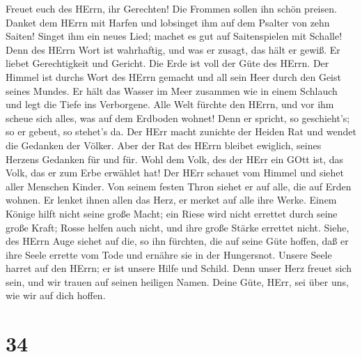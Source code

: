  Freuet euch des HErrn, ihr Gerechten! Die Frommen sollen
ihn schön preisen.  Danket dem HErrn mit Harfen und
lobsinget ihm auf dem Psalter von zehn Saiten!  Singet ihm
ein neues Lied; machet es gut auf Saitenspielen mit Schalle!
 Denn des HErrn Wort ist wahrhaftig, und was er zusagt, das
hält er gewiß.  Er liebet Gerechtigkeit und Gericht. Die
Erde ist voll der Güte des HErrn.  Der Himmel ist durchs
Wort des HErrn gemacht und all sein Heer durch den Geist seines Mundes.
 Er hält das Wasser im Meer zusammen wie in einem Schlauch
und legt die Tiefe ins Verborgene.  Alle Welt fürchte den
HErrn, und vor ihm scheue sich alles, was auf dem Erdboden wohnet!
 Denn er spricht, so geschieht's; so er gebeut, so stehet's
da.  Der HErr macht zunichte der Heiden Rat und wendet die
Gedanken der Völker.  Aber der Rat des HErrn bleibet
ewiglich, seines Herzens Gedanken für und für.  Wohl dem
Volk, des der HErr ein GOtt ist, das Volk, das er zum Erbe erwählet hat!
 Der HErr schauet vom Himmel und siehet aller Menschen
Kinder.  Von seinem festen Thron siehet er auf alle, die
auf Erden wohnen.  Er lenket ihnen allen das Herz, er
merket auf alle ihre Werke.  Einem Könige hilft nicht seine
große Macht; ein Riese wird nicht errettet durch seine große Kraft;
 Rosse helfen auch nicht, und ihre große Stärke errettet
nicht.  Siehe, des HErrn Auge siehet auf die, so ihn
fürchten, die auf seine Güte hoffen,  daß er ihre Seele
errette vom Tode und ernähre sie in der Hungersnot.  Unsere
Seele harret auf den HErrn; er ist unsere Hilfe und Schild.
 Denn unser Herz freuet sich sein, und wir trauen auf
seinen heiligen Namen.  Deine Güte, HErr, sei über uns, wie
wir auf dich hoffen.

\hypertarget{section-33}{%
\section{34}\label{section-33}}

